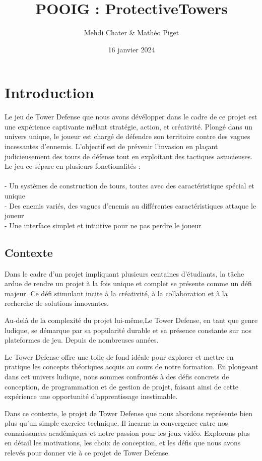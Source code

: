 \documentclass{article}
\title{POOIG : ProtectiveTowers}
\author{Mehdi Chater \& Mathéo Piget}
\date{16 janvier 2024}
\begin{document}
\maketitle

\tableofcontents
\newpage

\section{Introduction}
Le jeu de Tower Defense que nous avons dévélopper dans le cadre de ce projet est une expérience captivante mêlant stratégie, action, et créativité. Plongé dans un univers unique, le joueur est chargé de défendre son territoire contre des vagues incessantes d'ennemis. L'objectif est de prévenir l'invasion en plaçant judicieusement des tours de défense tout en exploitant des tactiques astucieuses. Le jeu ce sépare en plusieurs fonctionalités : \\
\\
- Un systèmes de construction de tours, toutes avec des caractéristique spécial et unique \\
- Des enemis variés, des vagues d'enemis au différentes caractéristiques attaque le joueur\\
- Une interface simplet et intuitive pour ne pas perdre le joueur

\subsection{Contexte}

Dans le cadre d'un projet impliquant plusieurs centaines d'étudiants, la tâche ardue de rendre un projet à la fois unique et complet se présente comme un défi majeur. Ce défi stimulant incite à la créativité, à la collaboration et à la recherche de solutions innovantes.

Au-delà de la complexité du projet lui-même,Le Tower Defense, en tant que genre ludique, se démarque par sa popularité durable et sa présence constante sur nos plateformes de jeu. Depuis de nombreuses années.

Le Tower Defense offre une toile de fond idéale pour explorer et mettre en pratique les concepts théoriques acquis au cours de notre formation. En plongeant dans cet univers ludique, nous sommes confrontés à des défis concrets de conception, de programmation et de gestion de projet, faisant ainsi de cette expérience une opportunité d'apprentissage inestimable.

Dans ce contexte, le projet de Tower Defense que nous abordons représente bien plus qu'un simple exercice technique. Il incarne la convergence entre nos connaissances académiques et notre passion pour les jeux vidéo. Explorons plus en détail les motivations, les choix de conception, et les défis que nous avons relevés pour donner vie à ce projet de Tower Defense.
\end{document}
